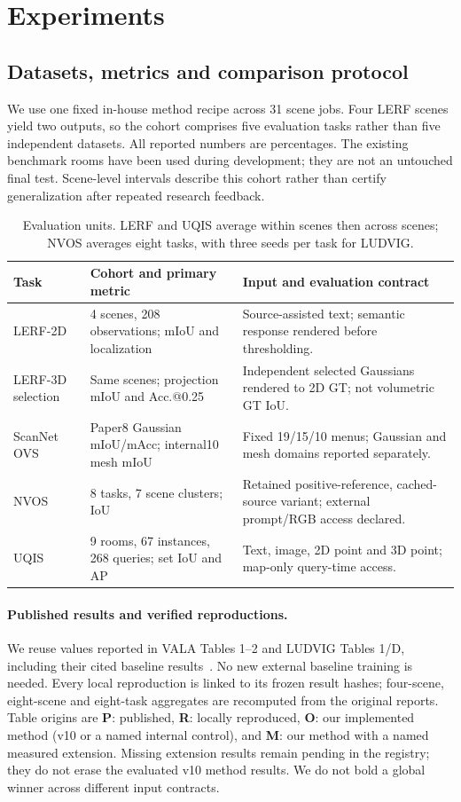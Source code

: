 \section{Experiments}
\label{sec:experiments}
\subsection{Datasets, metrics and comparison protocol}
We use one fixed in-house method recipe across 31 scene jobs. Four LERF scenes yield
two outputs, so the cohort comprises five evaluation tasks rather than five
independent datasets. All reported numbers are percentages. The existing
benchmark rooms have been used during development; they are not an untouched
final test. Scene-level intervals describe this cohort rather than certify
generalization after repeated research feedback.

\begin{table}[ht]
\centering\small
\begin{tabular}{lp{.25\linewidth}p{.43\linewidth}}
\toprule
Task & Cohort and primary metric & Input and evaluation contract \\
\midrule
LERF-2D & 4 scenes, 208 observations; mIoU and localization & Source-assisted text; semantic response rendered before thresholding. \\
LERF-3D selection & Same scenes; projection mIoU and Acc.@0.25 & Independent selected Gaussians rendered to 2D GT; not volumetric GT IoU. \\
ScanNet OVS & Paper8 Gaussian mIoU/mAcc; internal10 mesh mIoU & Fixed 19/15/10 menus; Gaussian and mesh domains reported separately. \\
NVOS & 8 tasks, 7 scene clusters; IoU & Retained positive-reference, cached-source variant; external prompt/RGB access declared. \\
UQIS & 9 rooms, 67 instances, 268 queries; set IoU and AP & Text, image, 2D point and 3D point; map-only query-time access. \\
\bottomrule
\end{tabular}
\caption{Evaluation units. LERF and UQIS average within scenes then across
scenes; NVOS averages eight tasks, with three seeds per task for LUDVIG.}
\label{tab:protocols}
\end{table}

\paragraph{Published results and verified reproductions.}
We reuse values reported in VALA Tables 1--2 and LUDVIG Tables 1/D, including
their cited baseline results~\cite{vala,ludvig}. No new external baseline training
is needed. Every local reproduction is linked to its frozen result hashes;
four-scene, eight-scene and eight-task aggregates are recomputed from the
original reports. Table origins are \textbf{P}: published, \textbf{R}: locally
reproduced, \textbf{O}: our implemented method (v10 or a named internal control), and \textbf{M}: our method with a named measured extension.
Missing extension results remain pending in the registry; they do not erase the evaluated v10 method results.
We do not bold a global winner across different input contracts.

